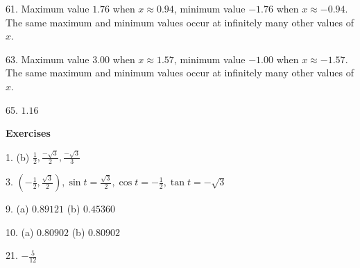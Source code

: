 61. Maximum value $1.76$ when $x \approx 0.94$, minimum value $ -1.76$ when $x \approx  -0.94\text{.}$ The same maximum and minimum values occur at infinitely many other values
of $x$. 

63. Maximum value $3.00$ when $x \approx 1.57\text{,}$ minimum value $ -1.00$ when $x \approx  -1.57$. The same maximum and minimum values occur at infinitely many other values of $x$. 

65. $1.16$ 

\textbf{Exercises} 
\begin{multicols}{2}

1. (b) $\frac{1}{2} ,\frac{ -\sqrt{3}}{2} ,\frac{ -\sqrt{3}}{3}$ 

3. $\left ( -\frac{1}{2} ,\frac{\sqrt{3}}{2}\right ) ,\sin  t =\frac{\sqrt{3}}{2} ,\cos  t = -\frac{1}{2} ,\tan  t = -\sqrt{3}$ 

9. (a) $0.89121$ (b) $0.45360$ 

10. (a) $0.80902$ (b) $0.80902$ 

21. $ -\frac{5}{12}$ 
\end{multicols}